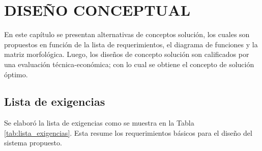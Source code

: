 
\chapter{\MakeUppercase{Diseño Conceptual}}
\thispagestyle{mainmatterstyle} %

En este capítulo se presentan alternativas de conceptos solución, los cuales son propuestos en función de la lista de requerimientos, el diagrama de funciones y la matriz morfológica. Luego, los diseños de concepto solución son calificados por una evaluación técnica-económica; con lo cual se obtiene el concepto de solución óptimo.

\section{Lista de exigencias}

Se elaboró la lista de exigencias como se muestra en la Tabla \ref{tab:lista_exigencias}. Esta resume los requerimientos básicos para el diseño del sistema propuesto.

